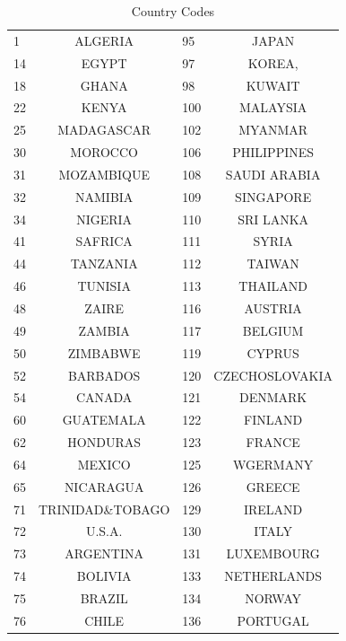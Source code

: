 \documentclass{scrartcl}
\begin{document}
	\begin{table}[h!]\caption{Country Codes}\label{tab:imp}
	\begin{center}
	
\begin{tabular}{|l|c|l|c|}

\hline

1 & ALGERIA     &       95  &JAPAN       \\
14& EGYPT       &       97  &KOREA,      \\
18& GHANA       &       98  &KUWAIT      \\
22& KENYA       &       100 &MALAYSIA    \\
25& MADAGASCAR  &       102 &MYANMAR    \\
30& MOROCCO     &       106 &PHILIPPINES     \\
31& MOZAMBIQUE  &       108 &SAUDI ARABIA    \\
32& NAMIBIA     &       109 &SINGAPORE   \\
34& NIGERIA     &       110 &SRI LANKA   \\
41& SAFRICA     &       111 &SYRIA       \\
44& TANZANIA    &       112 &TAIWAN      \\
46& TUNISIA     &       113 &THAILAND    \\
48& ZAIRE       &       116 &AUSTRIA     \\
49& ZAMBIA      &       117 &BELGIUM    \\
50& ZIMBABWE    &       119 &CYPRUS      \\
52& BARBADOS    &       120 &CZECHOSLOVAKIA  \\
54& CANADA      &       121 &DENMARK     \\
60& GUATEMALA   &       122 &FINLAND    \\
62& HONDURAS    &       123 &FRANCE      \\
64& MEXICO      &       125 &WGERMANY    \\
65& NICARAGUA   &       126 &GREECE      \\
71& TRINIDAD\&TOBAGO&       129 &IRELAND    \\
72& U.S.A.      &       130 &ITALY       \\
73& ARGENTINA   &       131 &LUXEMBOURG  \\
74& BOLIVIA     &       133 &NETHERLANDS     \\
75& BRAZIL      &       134 &NORWAY      \\
76& CHILE       &       136 &PORTUGAL    \\

\end{tabular}
\end{center}
\end{table}
\end{document}
